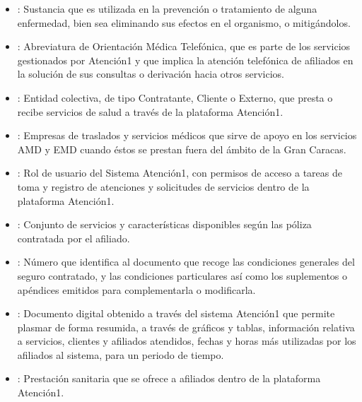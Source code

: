 \documentclass[letterpaper,10pt,spanish]{sphinxmanual}
\begin{document}
\begin{itemize}
\item {} 
: Sustancia que es utilizada en la prevención o tratamiento de alguna enfermedad, bien sea eliminando sus efectos en el organismo, o mitigándolos.

\item {} 
: Abreviatura de Orientación Médica Telefónica, que es parte de los servicios gestionados por Atención\sphinxhyphen{}1 y que implica la atención telefónica de afiliados en la solución de sus consultas o derivación hacia otros servicios.

\item {} 
: Entidad colectiva, de tipo Contratante, Cliente o Externo, que presta o recibe servicios de salud a través de la plataforma Atención\sphinxhyphen{}1.

\item {} 
: Empresas de traslados y servicios médicos que sirve de apoyo en los servicios AMD y EMD cuando éstos se prestan fuera del ámbito de la Gran Caracas.

\item {} 
: Rol de usuario del Sistema Atención\sphinxhyphen{}1, con permisos de acceso a tareas de toma y registro de atenciones y solicitudes de servicios dentro de la plataforma Atención\sphinxhyphen{}1.

\item {} 
: Conjunto de servicios y características disponibles según las póliza contratada por el afiliado.

\item {} 
: Número que identifica al documento que recoge las condiciones generales del seguro contratado, y las condiciones particulares así como los suplementos o apéndices emitidos para complementarla o modificarla.

\item {} 
: Documento digital obtenido a través del sistema Atención\sphinxhyphen{}1 que permite plasmar de forma resumida, a través de gráficos y tablas, información relativa a servicios, clientes y afiliados atendidos, fechas y horas más utilizadas por los afiliados al sistema, para un periodo de tiempo.

\item {} 
: Prestación sanitaria que se ofrece a afiliados dentro de la plataforma Atención\sphinxhyphen{}1.


\end{itemize}
\end{document}
